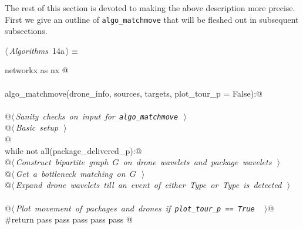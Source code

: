 \documentclass[10pt, english, oneside]{report}
\begin{document}
The rest of this section is devoted to making the above description 
more precise. First we give an outline of  \verb|algo_matchmove| that will be 
fleshed out in subsequent subsections. 

\begin{flushleft} \small
\begin{minipage}{\linewidth}\label{scrap13}\raggedright\small
{} $\langle\,${\itshape Algorithms}\nobreak\ {\footnotesize {14a}}$\,\rangle\equiv$
\vspace{-1ex}
\begin{list}{}{} \item
\mbox{}\verb@import networkx as nx @\\
\mbox{}\verb@@\\
\mbox{}\verb@def algo_matchmove(drone_info, sources, targets, plot_tour_p = False):@\\
\mbox{}\verb@@\\
\mbox{}\verb@     @\hbox{$\langle\,${\itshape Sanity checks on input for \verb|algo_matchmove|}\nobreak\ {\footnotesize {}}$\,\rangle$}\verb@@\\
\mbox{}\verb@     @\hbox{$\langle\,${\itshape Basic setup}\nobreak\ {\footnotesize {}}$\,\rangle$}\verb@@\\
\mbox{}\verb@    @\\
\mbox{}\verb@     while not all(package_delivered_p):@\\
\mbox{}\verb@          @\hbox{$\langle\,${\itshape Construct bipartite graph $G$ on drone wavelets and package wavelets}\nobreak\ {\footnotesize {}}$\,\rangle$}\verb@@\\
\mbox{}\verb@          @\hbox{$\langle\,${\itshape Get a bottleneck matching on $G$}\nobreak\ {\footnotesize {}}$\,\rangle$}\verb@@\\
\mbox{}\verb@          @\hbox{$\langle\,${\itshape Expand drone wavelets till an event of either Type  or Type  is detected}\nobreak\ {\footnotesize {}}$\,\rangle$}\verb@@\\
\mbox{}\verb@@\\
\mbox{}\verb@     @\hbox{$\langle\,${\itshape Plot movement of packages and drones if \verb|plot_tour_p == True |}\nobreak\ {\footnotesize {}}$\,\rangle$}\verb@ @\\
\mbox{}\verb@     #return pass pass pass pass pass @\\
\mbox{}\verb@@{\NWsep}
\end{list}

\end{minipage}
\end{flushleft}
\end{document}
